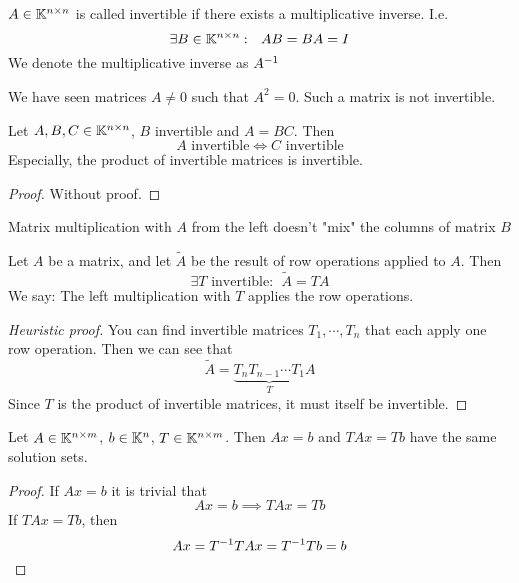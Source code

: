 \documentclass[../../script.tex]{subfiles}
\begin{document}
\begin{defi}
	$A \in \mathbb{K}^{n \times n}$ is called invertible if there exists a multiplicative inverse. I.e.
	\[
		\exists B \in \mathbb{K}^{n \times n}: ~~AB = BA = I
	\]
	We denote the multiplicative inverse as ${A}^{-1}$
\end{defi}

\begin{rem}
	We have seen matrices $A \ne 0$ such that $A^2 = 0$. Such a matrix is not invertible.
\end{rem}

\begin{thm}
	Let $A, B, C \in \mathbb{K}^{n \times n}$, $B$ invertible and $A = BC$. Then
	\[
		A \text{ invertible} \iff C \text{ invertible}
	\]
	Especially, the product of invertible matrices is invertible.
\end{thm}
\begin{proof}
	Without proof.
\end{proof}

\begin{rem}
	Matrix multiplication with $A$ from the left doesn't "mix" the columns of matrix $B$
\end{rem}

\begin{thm}
	Let $A$ be a matrix, and let $\tilde{A}$ be the result of row operations applied to $A$. Then
	\[
		\exists T \text{ invertible}: ~~\tilde{A} = TA
	\]
	We say: The left multiplication with $T$ applies the row operations.
\end{thm}
\begin{proof}[Heuristic proof]
	You can find invertible matrices $T_1, \cdots, T_n$ that each apply one row operation. Then we can see that
	\begin{equation}
		\tilde{A} = \underbrace{T_n T_{n-1} \cdots T_1}_T A
	\end{equation}
	Since $T$ is the product of invertible matrices, it must itself be invertible.
\end{proof}

\begin{cor}
	Let $A \in \mathbb{K}^{n \times m}$, $b \in \mathbb{K}^n$, $T \in \mathbb{K}^{n \times m}$. Then $Ax = b$ and $TAx = Tb$ have the same solution sets.
\end{cor}
\begin{proof}
	If $Ax = b$ it is trivial that
	\begin{equation}
		Ax = b \implies TAx = Tb
	\end{equation}
	If $TAx = Tb$, then
	\begin{equation}
		Ax = {T}^{-1}TAx = {T}^{-1}Tb = b
	\end{equation}
\end{proof}
\end{document}
